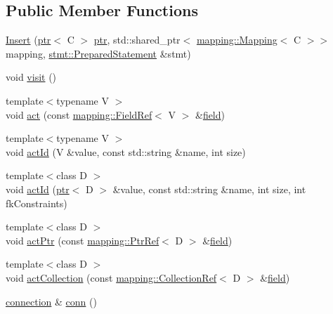 \subsection*{Public Member Functions}
\begin{DoxyCompactItemize}
\item 
\hyperlink{classdbo_1_1action_1_1_insert_a3ced46fb3e173ec079b47b223db6280c}{Insert} (\hyperlink{classdbo_1_1ptr}{ptr}$<$ C $>$ \hyperlink{classdbo_1_1ptr}{ptr}, std\+::shared\+\_\+ptr$<$ \hyperlink{classdbo_1_1mapping_1_1_mapping}{mapping\+::\+Mapping}$<$ C $>$$>$ mapping, \hyperlink{classdbo_1_1stmt_1_1_prepared_statement}{stmt\+::\+Prepared\+Statement} \&stmt)
\item 
void \hyperlink{classdbo_1_1action_1_1_insert_adf09ae0bc0f40ad9dadb1423e3a93eff}{visit} ()
\item 
{\footnotesize template$<$typename V $>$ }\\void \hyperlink{classdbo_1_1action_1_1_insert_a380b26e25745133af71e9291c4413a96}{act} (const \hyperlink{classdbo_1_1mapping_1_1_field_ref}{mapping\+::\+Field\+Ref}$<$ V $>$ \&\hyperlink{namespacedbo_ad1f50f02cb050acf946807959252a93f}{field})
\item 
{\footnotesize template$<$typename V $>$ }\\void \hyperlink{classdbo_1_1action_1_1_insert_a5bbfc3d346d3ac7b95544159e1f8bc3e}{act\+Id} (V \&value, const std\+::string \&name, int size)
\item 
{\footnotesize template$<$class D $>$ }\\void \hyperlink{classdbo_1_1action_1_1_insert_a58afaf6a6d03ed7c8da491350e93b161}{act\+Id} (\hyperlink{classdbo_1_1ptr}{ptr}$<$ D $>$ \&value, const std\+::string \&name, int size, int fk\+Constraints)
\item 
{\footnotesize template$<$class D $>$ }\\void \hyperlink{classdbo_1_1action_1_1_insert_ab481e055cba6c205bc286ea586b3f538}{act\+Ptr} (const \hyperlink{classdbo_1_1mapping_1_1_ptr_ref}{mapping\+::\+Ptr\+Ref}$<$ D $>$ \&\hyperlink{namespacedbo_ad1f50f02cb050acf946807959252a93f}{field})
\item 
{\footnotesize template$<$class D $>$ }\\void \hyperlink{classdbo_1_1action_1_1_insert_aef4bc2afc4e946048534eecc24cbdcd3}{act\+Collection} (const \hyperlink{classdbo_1_1mapping_1_1_collection_ref}{mapping\+::\+Collection\+Ref}$<$ D $>$ \&\hyperlink{namespacedbo_ad1f50f02cb050acf946807959252a93f}{field})
\item 
\hyperlink{classdbo_1_1connection}{connection} \& \hyperlink{classdbo_1_1action_1_1_insert_a5f04551268ff028ac7bc580ed5325ac1}{conn} ()
\end{DoxyCompactItemize}
